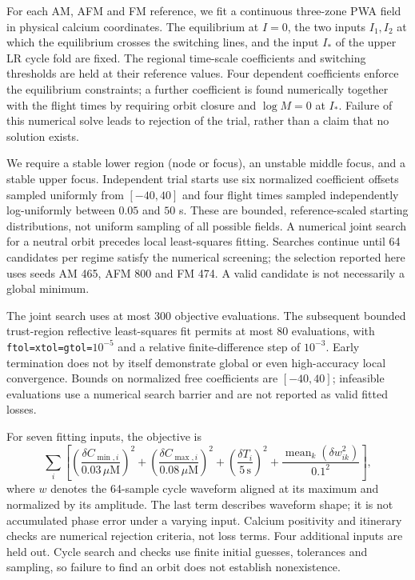 For each AM, AFM and FM reference, we fit a continuous three-zone PWA field in physical calcium coordinates. The equilibrium at $I=0$, the two inputs $I_1,I_2$ at which the equilibrium crosses the switching lines, and the input $I_*$ of the upper LR cycle fold are fixed. The regional time-scale coefficients and switching thresholds are held at their reference values. Four dependent coefficients enforce the equilibrium constraints; a further coefficient is found numerically together with the flight times by requiring orbit closure and $\log M=0$ at $I_*$. Failure of this numerical solve leads to rejection of the trial, rather than a claim that no solution exists.

We require a stable lower region (node or focus), an unstable middle focus, and a stable upper focus. Independent trial starts use six normalized coefficient offsets sampled uniformly from $[-40,40]$ and four flight times sampled independently log-uniformly between $0.05$ and $50$ s. These are bounded, reference-scaled starting distributions, not uniform sampling of all possible fields. A numerical joint search for a neutral orbit precedes local least-squares fitting. Searches continue until 64 candidates per regime satisfy the numerical screening; the selection reported here uses seeds AM 465, AFM 800 and FM 474. A valid candidate is not necessarily a global minimum.

The joint search uses at most 300 objective evaluations. The subsequent bounded trust-region reflective least-squares fit permits at most 80 evaluations, with \texttt{ftol=xtol=gtol=$10^{-5}$} and a relative finite-difference step of $10^{-3}$. Early termination does not by itself demonstrate global or even high-accuracy local convergence. Bounds on normalized free coefficients are $[-40,40]$; infeasible evaluations use a numerical search barrier and are not reported as valid fitted losses.

For seven fitting inputs, the objective is
\begin{equation}
\sum_i \left[\left(\frac{\delta C_{\min,i}}{0.03\,\mu\mathrm M}\right)^2+\left(\frac{\delta C_{\max,i}}{0.08\,\mu\mathrm M}\right)^2+\left(\frac{\delta T_i}{5\,\mathrm s}\right)^2+\frac{\operatorname{mean}_k(\delta w_{ik}^2)}{0.1^2}\right],
\end{equation}
where $w$ denotes the 64-sample cycle waveform aligned at its maximum and normalized by its amplitude. The last term describes waveform shape; it is not accumulated phase error under a varying input. Calcium positivity and itinerary checks are numerical rejection criteria, not loss terms. Four additional inputs are held out. Cycle search and checks use finite initial guesses, tolerances and sampling, so failure to find an orbit does not establish nonexistence.
